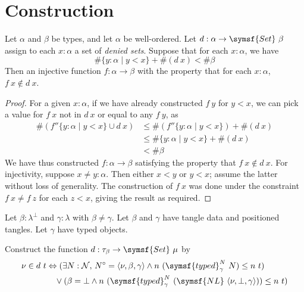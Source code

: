 \section{Construction}

\begin{lemma}
    \label{lem:chooseWf}
    Let \( \alpha \) and \( \beta \) be types, and let \( \alpha \) be well-ordered.
    Let \( d : \alpha \to \symsf{Set}\ \beta \) assign to each \( x : \alpha \) a set of \emph{denied sets}.
    Suppose that for each \( x : \alpha \), we have
    \[ \#\{ y : \alpha \mid y < x \} + \#(d\ x) < \#\beta \]
    Then  an injective function \( f : \alpha \to \beta \) with the property that for each \( x : \alpha \), \( f\ x \not\in d\ x \).
\end{lemma}
\begin{proof}
    For a given \( x : \alpha \), if we have already constructed \( f\ y \) for \( y < x \), we can pick a value for \( f\ x \) not in \( d\ x \) or equal to any \( f\ y \), as
    \begin{align*}
        \#(f '' \{ y : \alpha \mid y < x \} \cup d\ x) &\leq \#(f '' \{ y : \alpha \mid y < x \}) + \#(d\ x) \\
        &\leq \#\{ y : \alpha \mid y < x \} + \#(d\ x) \\
        &< \#\beta
    \end{align*}
    We have thus constructed \( f : \alpha \to \beta \) satisfying the property that \( f\ x \not\in d\ x \).
    For injectivity, suppose \( x \neq y : \alpha \).
    Then either \( x < y \) or \( y < x \); assume the latter without loss of generality.
    The construction of \( f\ x \) was done under the constraint \( f\ x \neq f\ z \) for each \( z < x \), giving the result as required.
\end{proof}
Let \( \beta : \lambda^\bot \) and \( \gamma : \lambda \) with \( \beta \neq \gamma \).
Let \( \beta \) and \( \gamma \) have tangle data and positioned tangles.
Let \( \gamma \) have typed objects.
\begin{definition}
    \label{def:fuzz_deny}
    Construct the function \( d : \tau_\beta \to \symsf{Set}\ \mu \) by
    \begin{align*}
        \nu \in d\ t &\Leftrightarrow (\exists N : \mathcal N,\, N^\circ = \langle \nu, \beta, \gamma \rangle \wedge n\ (\symsf{typed}^N_\gamma\ N) \leq n\ t) \\
        &\quad\vee (\beta = \bot \wedge n\ (\symsf{typed}^N_\gamma\ (\symsf{NL}\ \langle \nu, \bot, \gamma \rangle)) \leq n\ t)
    \end{align*}
\end{definition}
